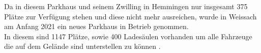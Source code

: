 Da in diesem Parkhaus und seinem Zwilling in Hemmingen nur insgesamt 375 Plätze zur Verfügung stehen und diese nicht mehr ausreichen, wurde in Weissach am Anfang 2021 ein neues Parkhaus in Betrieb genommen. \\
In diesem sind 1147 Plätze, sowie 400 Ladesäulen vorhanden um alle Fahrzeuge die auf dem Gelände sind unterstellen zu können \cite{PTPark}. \\

